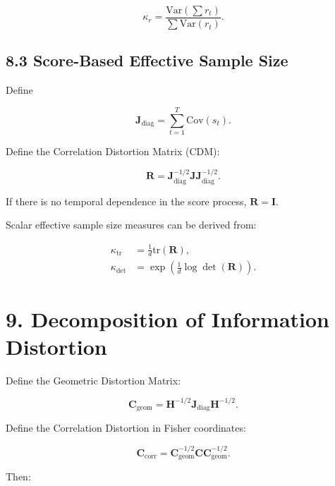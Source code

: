 \documentclass[11pt]{article}
\begin{document}
\begin{equation}
\kappa_r
=
\frac{\mathrm{Var}\!\left(\sum r_t\right)}
{\sum \mathrm{Var}(r_t)}.
\end{equation}

\subsection*{8.3 Score-Based Effective Sample Size}

Define

\begin{equation}
\mathbf J_{\mathrm{diag}}
=
\sum_{t=1}^T \mathrm{Cov}(s_t).
\end{equation}

Define the Correlation Distortion Matrix (CDM):

\begin{equation}
\mathbf R
=
\mathbf J_{\mathrm{diag}}^{-1/2}
\mathbf J
\mathbf J_{\mathrm{diag}}^{-1/2}.
\end{equation}

If there is no temporal dependence in the score process,
$\mathbf R = \mathbf I$.

Scalar effective sample size measures can be derived from:

\begin{align}
\kappa_{\mathrm{tr}} &= \frac{1}{d}\mathrm{tr}(\mathbf R), \\
\kappa_{\mathrm{det}} &= \exp\left(\frac{1}{d}\log\det(\mathbf R)\right).
\end{align}

\section*{9. Decomposition of Information Distortion}

Define the Geometric Distortion Matrix:

\begin{equation}
\mathbf C_{\mathrm{geom}}
=
\mathbf H^{-1/2}
\mathbf J_{\mathrm{diag}}
\mathbf H^{-1/2}.
\end{equation}

Define the Correlation Distortion in Fisher coordinates:

\begin{equation}
\mathbf C_{\mathrm{corr}}
=
\mathbf C_{\mathrm{geom}}^{-1/2}
\mathbf C
\mathbf C_{\mathrm{geom}}^{-1/2}.
\end{equation}

Then:
\end{document}
